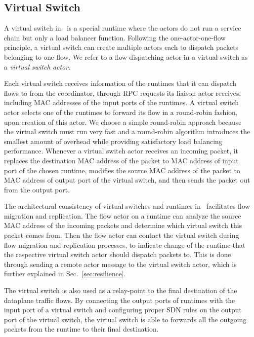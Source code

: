 \subsection{Virtual Switch}
\label{sec:virtualswitch}

A virtual switch in \nfactor~is a special runtime where the actors do not run a service chain but only a load balancer function. Following the one-actor-one-flow principle, a virtual switch can create multiple actors each to dispatch packets belonging to one flow. We refer to a flow dispatching actor in a virtual switch as a {\em virtual switch actor}.


Each virtual switch receives information of the runtimes that it can dispatch flows to from the coordinator, through RPC requests its liaison actor receives, including MAC addresses of the input ports of the runtimes. A virtual switch actor selects one of the runtimes to forward its flow in a round-robin fashion, upon creation of this actor. We choose a simple round-robin approach because the virtual switch must run very fast and a round-robin algorithm introduces the smallest amount of overhead while providing satisfactory load balancing performance. Whenever a virtual switch actor receives an incoming packet, it replaces the destination MAC address of the packet to MAC address of input port of the chosen runtime, modifies the source MAC address of the packet to MAC address of output port of the virtual switch, and then sends the packet out from the output port.

The architectural consistency of virtual switches and runtimes in \nfactor~facilitates flow migration and replication. The flow actor on a runtime can analyze the source MAC address of the incoming packets and determine which virtual switch this packet comes from. Then the flow actor can contact the virtual switch during flow migration and replication processes, to indicate change of the runtime that the respective virtual switch actor should dispatch packets to. This is done through sending a remote actor message to the virtual switch actor, which is further explained in Sec.~\ref{sec:resilience}. %

The virtual switch is also used as a relay-point to the final destination of the dataplane traffic flows. By connecting the output ports of runtimes with the input port of a virtual switch and configuring proper SDN rules on the output port of the virtual switch, the virtual switch is able to forwards all the outgoing packets from the runtime to their final destination.

